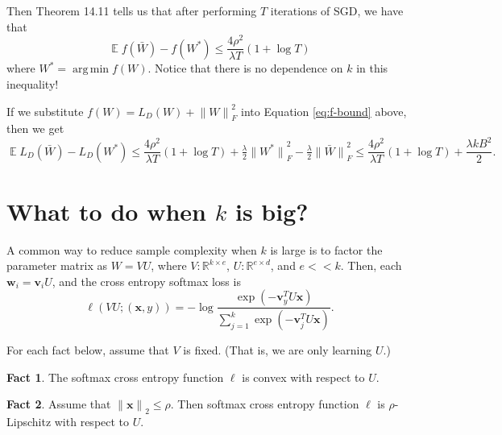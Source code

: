 \documentclass[10pt]{article}
\theoremstyle{definition}
\newtheorem{fact}{Fact}
\newcommand{\R}{\mathbb R}
\DeclareMathOperator{\E}{\mathbb E}
\DeclareMathOperator*{\argmin}{arg\,min}
\newcommand{\trans}[1]{{#1}^{T}}
\newcommand{\loss}{\ell}
\newcommand{\vv}{\mathbf v}
\newcommand{\w}{\mathbf w}
\newcommand{\x}{\mathbf x}
\newcommand{\ltwo}[1]{{\lVert {#1} \rVert}_2}
\newcommand{\lF}[1]{{\lVert {#1} \rVert}_F}
\begin{document}
\vspace{3in}
\noindent
Then Theorem 14.11 tells us that after performing $T$ iterations of SGD, we have that
\begin{equation}
    \label{eq:f-bound}
    \E f(\bar W) - f(W^*) \le \frac{4\rho^2}{\lambda T} ( 1 + \log T)
\end{equation}
where $W^* = \argmin f(W)$.
Notice that there is no dependence on $k$ in this inequality!

\newpage
If we substitute $f(W)=L_D(W)+\lF{W}^2$ into Equation \ref{eq:f-bound} above,
then we get
\begin{equation}
    \E L_D(\bar W) - L_D(W^*) 
    \le \frac{4\rho^2}{\lambda T} ( 1 + \log T) + \tfrac\lambda2\lF{W^*}^2 - \tfrac\lambda2\lF{\bar W}^2
    \le \frac{4\rho^2}{\lambda T} ( 1 + \log T) + \frac{\lambda k B^2}{2}
    .
\end{equation}

\newpage
\section{What to do when $k$ is big?}

A common way to reduce sample complexity when $k$ is large is to factor the parameter matrix as $W = VU$,
where $V : \R ^ {k \times e}$, $U : \R^{e \times d}$, and $e<\!<\!k$.
Then, each $\w_i = \vv_i U$, and the cross entropy softmax loss is
\begin{equation}
    \ell(VU;(\x,y)) = - \log \frac {\exp(-\trans\vv_y U \x)}{\sum_{j=1}^k \exp(-\trans \vv_j U \x)}
    .
\end{equation}


\noindent
For each fact below, assume that $V$ is fixed.
(That is, we are only learning $U$.)

\begin{fact}
    The softmax cross entropy function $\loss$ is convex with respect to $U$.
\end{fact}

\begin{fact}
    Assume that $\ltwo{\x}\le \rho$.
    Then softmax cross entropy function $\loss$ is $\rho$-Lipschitz with respect to $U$.
\end{fact}
\end{document}
